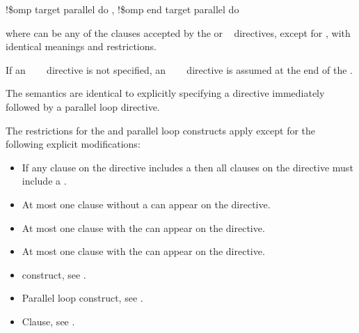 {{{{\begin{samepage}
\begin{boxedcode}
!\$omp target parallel do \plc{[clause[ [},\plc{] clause] ... ]}
\plc{[}!\$omp end target parallel do\plc{]}
\end{boxedcode}
\end{samepage}

where  can be any of the clauses accepted by the  or 
~ directives, except for , with identical meanings and restrictions.

If an ~~~ directive is not specified, an 
~~~ directive is assumed at the end of 
the .
\fortranspecificend

\descr
The semantics are identical to explicitly specifying a  directive
immediately followed by a parallel loop directive.


\restrictions
The restrictions for the  and parallel loop constructs apply except for the following explicit modifications:

\begin{itemize}
\item If any  clause on the directive includes a
       then all  clauses 
      on the directive must include a .

\item At most one  clause without a 
       can appear on the directive.

\item At most one  clause with the  
       can appear on the directive.


\item At most one  clause with the  
       can appear on the directive.
\end{itemize}

\crossreferences
\begin{itemize}
\item {} construct, see
.

\item Parallel loop construct, see
.

\item {} Clause, see .


\end{itemize}}}}}
